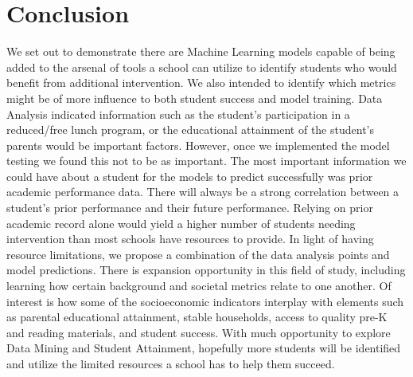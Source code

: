 \documentclass[man,floatsintext]{apa6} %
\begin{document}
\section{Conclusion}
We set out to demonstrate there are Machine Learning models capable of being added to the arsenal of tools a school can utilize to identify students who would benefit from additional intervention. We also intended to identify which metrics might be of more influence to both student success and model training.
Data Analysis indicated information such as the student's participation in a reduced/free lunch program, or the educational attainment of the student's parents would be important factors.  However, once we implemented the model testing we found this not to be as important. The most important information we could have about a student for the models to predict successfully was prior academic performance data.
There will always be a strong correlation between a student's prior performance and their future performance. Relying on prior academic record alone would yield a higher number of students needing intervention than most schools have resources to provide. In light of having resource limitations, we propose a combination of the data analysis points and model predictions. There is expansion opportunity in this field of study, including learning how certain background and societal metrics relate to one another. Of interest is how some of the socioeconomic indicators interplay with elements such as parental educational attainment, stable households, access to quality pre-K and reading materials, and student success. 
With much opportunity to explore Data Mining and Student Attainment, hopefully more students will be identified and utilize the limited resources a school has to help them succeed. 

\end{document}
